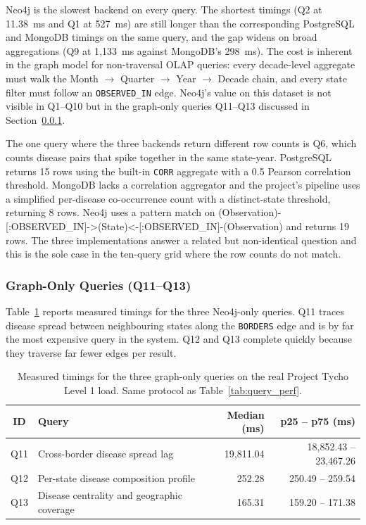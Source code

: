 \documentclass[12pt,a4paper]{article}
\begin{document}
Neo4j is the slowest backend on every query. The shortest timings (Q2 at 11.38~ms and Q1 at 527~ms) are still longer than the corresponding PostgreSQL and MongoDB timings on the same query, and the gap widens on broad aggregations (Q9 at 1{,}133~ms against MongoDB's 298~ms). The cost is inherent in the graph model for non-traversal OLAP queries: every decade-level aggregate must walk the Month $\rightarrow$ Quarter $\rightarrow$ Year $\rightarrow$ Decade chain, and every state filter must follow an \texttt{OBSERVED\_IN} edge. Neo4j's value on this dataset is not visible in Q1--Q10 but in the graph-only queries Q11--Q13 discussed in Section~\ref{sec:graphonly}.

The one query where the three backends return different row counts is Q6, which counts disease pairs that spike together in the same state-year. PostgreSQL returns 15 rows using the built-in \texttt{CORR} aggregate with a 0.5 Pearson correlation threshold. MongoDB lacks a correlation aggregator and the project's pipeline uses a simplified per-disease co-occurrence count with a distinct-state threshold, returning 8 rows. Neo4j uses a pattern match on (Observation)-[:OBSERVED\_IN]->(State)<-[:OBSERVED\_IN]-(Observation) and returns 19 rows. The three implementations answer a related but non-identical question and this is the sole case in the ten-query grid where the row counts do not match.

\subsubsection{Graph-Only Queries (Q11--Q13)}
\label{sec:graphonly}

Table~\ref{tab:query_graph_only} reports measured timings for the three Neo4j-only queries. Q11 traces disease spread between neighbouring states along the \texttt{BORDERS} edge and is by far the most expensive query in the system. Q12 and Q13 complete quickly because they traverse far fewer edges per result.

\begin{table}[H]
\centering
\caption{Measured timings for the three graph-only queries on the real Project Tycho Level 1 load. Same protocol as Table~\ref{tab:query_perf}.}
\label{tab:query_graph_only}
\begin{tabular}{clrr}
\toprule
\textbf{ID} & \textbf{Query} & \textbf{Median (ms)} & \textbf{p25 -- p75 (ms)} \\
\midrule
Q11 & Cross-border disease spread lag             & 19{,}811.04 & 18{,}852.43 -- 23{,}467.26 \\
Q12 & Per-state disease composition profile       &    252.28 &    250.49 -- 259.54 \\
Q13 & Disease centrality and geographic coverage  &    165.31 &    159.20 -- 171.38 \\
\bottomrule
\end{tabular}
\end{table}
\end{document}
